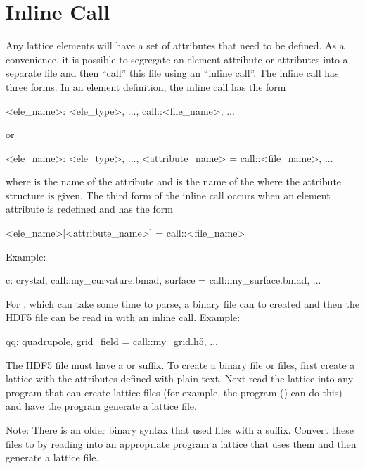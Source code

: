 {{{%
\section{Inline Call}
\label{s:call.inline}

Any lattice elements will have a set of attributes that need to be defined.
As a convenience, it is possible to segregate an element attribute or attributes
into a separate file and then ``call'' this file using an
``inline call''. The inline call has three forms. In an element definition,
the inline call has the form
\begin{example}
  <ele_name>: <ele_type>, ..., call::<file_name>, ...
\end{example}
or
\begin{example}
  <ele_name>: <ele_type>, ..., <attribute_name> = call::<file_name>, ...
\end{example}
where  is the name of the attribute and
 is the name of the where the attribute structure is
given.  The third form of the inline call occurs when an element
attribute is redefined and has the form
\begin{example}
  <ele_name>[<attribute_name>] = call::<file_name>
\end{example}
Example:
\begin{example}
  c: crystal, call::my_curvature.bmad, surface = call::my_surface.bmad, ...
\end{example}  

For , which can take some time to parse, a  binary file can to created and then
the HDF5 file can be read in with an inline call. Example:
\begin{example}
  qq: quadrupole, grid_field = call::my_grid.h5, ...
\end{example}
The HDF5 file must have a  or  suffix. To create a binary file or files, first
create a lattice with the attributes defined with plain text. Next read the lattice into any program
that can create \bmad lattice files (for example, the \tao program () can do this)
and have the program generate a lattice file.

Note: There is an older binary syntax that used files with a  suffix. Convert these files
to  by reading into an appropriate program a lattice that uses them and then generate a
lattice file.

}}}
